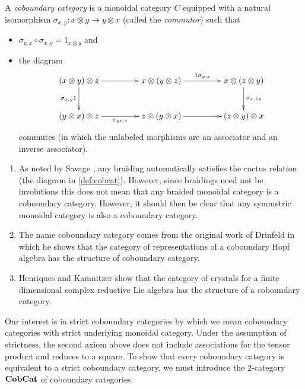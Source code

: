\begin{Defi}\label{def:cobcat}
A \textit{coboundary category} is a monoidal category $C$ equipped with a natural isomorphism $\sigma_{x,y} \colon x \otimes y \rightarrow y \otimes x$ (called the \textit{commutor}) such that
\begin{itemize}
\item $\sigma_{y,x} \circ \sigma_{x,y} = 1_{x \otimes y}$ and
\item the diagram
  \[
    \xy
      (0,0)*+{(x \otimes y) \otimes z} ="00";
      (35,0)*+{x \otimes (y \otimes z)} ="10";
      (70,0)*+{x \otimes (z \otimes y)} ="20";
      (0,-15)*+{(y \otimes x) \otimes z} ="01";
      (35,-15)*+{z \otimes (y \otimes x)} ="11";
      (70,-15)*+{(z \otimes y )\otimes x} ="21";
      {\ar "00"; "10" };
      {\ar^{1 \sigma_{y,z}} "10"; "20" };
      {\ar^{\sigma_{x,zy}} "20"; "21" };
      {\ar_{\sigma_{x,y}1} "00"; "01" };
      {\ar_{\sigma_{yx,z}} "01"; "11" };
      {\ar "11"; "21" };
    \endxy
  \]
commutes (in which the unlabeled morphisms are an associator and an inverse associator).
\end{itemize}
\end{Defi}

\begin{example}\label{ex:cobcats}
\begin{enumerate}
\item As noted by Savage \cite{savage-braidcob}, any braiding automatically satisfies the cactus relation (the diagram in \cref{def:cobcat}). However, since braidings need not be involutions this does not mean that any braided monoidal category is a coboundary category. However, it should then be clear that any symmetric monoidal category is also a coboundary category.
\item The name coboundary category comes from the original work of Drinfeld \cite{drin-quasihopf} in which he shows that the category of representations of a coboundary Hopf algebra has the structure of coboundary category.
\item Henriques and Kamnitzer \cite{hk-cobound} show that the category of crystals for a finite dimensional complex reductive Lie algebra has the structure of a coboundary category. 
\end{enumerate}
\end{example}


Our interest is in strict coboundary categories by which we mean coboundary categories with strict underlying monoidal category. Under the assumption of strictness, the second axiom above does not include associations for the tensor product and reduces to a square. To show that every coboundary category is equivalent to a strict coboundary category, we must introduce the $2$-category $\mathbf{CobCat}$ of coboundary categories.

